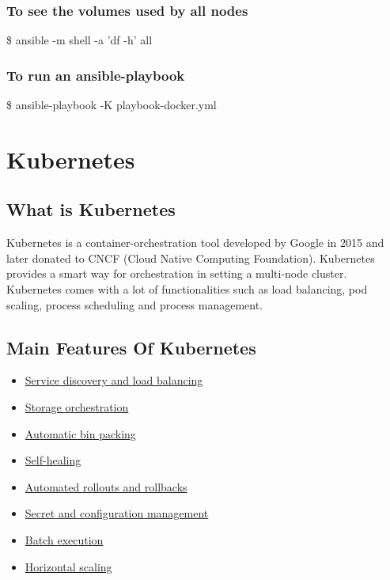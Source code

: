 \documentclass[12pt]{article}
\begin{document}
\subsubsection{To see the volumes used by all nodes}
\$ ansible -m shell -a 'df -h' all
\subsubsection{To run an ansible-playbook}
\$ ansible-playbook  -K playbook-docker.yml
\section{Kubernetes}
\subsection{What is Kubernetes}
Kubernetes is a container-orchestration tool developed by Google in 2015 and later donated to CNCF (Cloud Native Computing Foundation). Kubernetes provides a smart way for orchestration in setting a multi-node cluster. Kubernetes comes with a lot of functionalities such as load balancing, pod scaling, process scheduling and process management.
\subsection{Main Features Of Kubernetes}
\begin{itemize}
	\item \href{https://kubernetes.io/docs/concepts/services-networking/service/}{Service discovery and load balancing}
	\item \href{https://kubernetes.io/docs/concepts/storage/persistent-volumes/}{Storage orchestration}
	\item \href{https://kubernetes.io/docs/concepts/configuration/manage-compute-resources-container/}{Automatic bin packing}
	\item \href{https://kubernetes.io/docs/concepts/workloads/controllers/replicationcontroller/#how-a-replicationcontroller-works}{Self-healing}
	\item \href{https://kubernetes.io/docs/concepts/workloads/controllers/deployment/}{Automated rollouts and rollbacks}
	\item \href{https://kubernetes.io/docs/concepts/configuration/secret/}{Secret and configuration management}
	\item \href{https://kubernetes.io/docs/concepts/workloads/controllers/jobs-run-to-completion/}{Batch execution}
	\item \href{https://kubernetes.io/docs/tasks/run-application/horizontal-pod-autoscale/}{Horizontal scaling}
\end{itemize}
\end{document}
